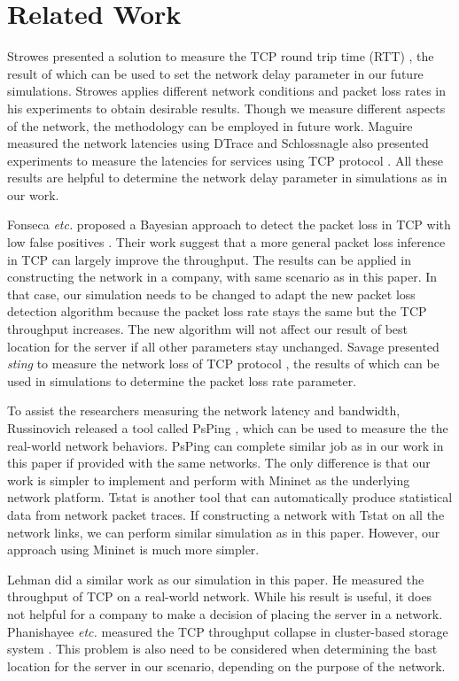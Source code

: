 \section{Related Work} \label{sec:related}

Strowes presented a solution to measure the TCP round trip time (RTT) \cite{Strowes:2013},
the result of which can be used to set the network delay parameter in our future simulations. 
Strowes applies different network conditions and packet loss rates in his experiments to 
obtain desirable results. Though we measure different aspects of the network, the methodology
can be employed in future work. Maguire measured the network latencies using DTrace \cite{Maguire:2010}
and Schlossnagle also presented experiments to measure the latencies
for services using TCP protocol \cite{Schlossnagle:2013}. 
All these results are helpful to determine the network delay parameter in simulations 
as in our work.

Fonseca {\it etc.} proposed a Bayesian approach to detect the packet loss in
TCP with low false positives \cite{FonsecaCrovella:Infocom05}. Their work suggest
that a more general packet loss inference in TCP can largely improve the throughput.
The results can be applied in constructing the network in a company, with same 
scenario as in this paper. In that case, our simulation needs to be changed
to adapt the new packet loss detection algorithm because the packet loss rate 
stays the same but the TCP throughput increases. The new algorithm will not 
affect our result of best location for the server if all other parameters 
stay unchanged. Savage presented {\it sting} to measure the network loss of TCP
protocol \cite{Savage:1999}, the results of which can be used in simulations to determine the 
packet loss rate parameter. 

To assist the researchers
measuring the network latency and bandwidth, Russinovich released a tool called PsPing
\cite{PsPing:tool}, which can be used to measure the the real-world network behaviors. 
PsPing can complete similar job as in our work in this paper if provided with the same  
networks. The only difference is that our work is simpler to implement and 
perform with Mininet as the underlying network platform. 
Tstat \cite{Tstat:tool} is another tool that can automatically produce statistical data from network 
packet traces. If constructing a network with Tstat on all the network 
links, we can perform similar simulation as in this paper. However, 
our approach using Mininet is much more simpler.

Lehman did a similar work  \cite{Lehman:2001} as our simulation in this paper.
He measured the throughput of TCP on a real-world network. While his result is
useful, it does not helpful for a company to make a decision of placing the 
server in a network. Phanishayee {\it etc.} measured the TCP throughput collapse in cluster-based
storage system \cite{Phanishayee:2008}. This problem is also need to 
be considered when determining the bast location for the server in our
scenario, depending on the purpose of the network.